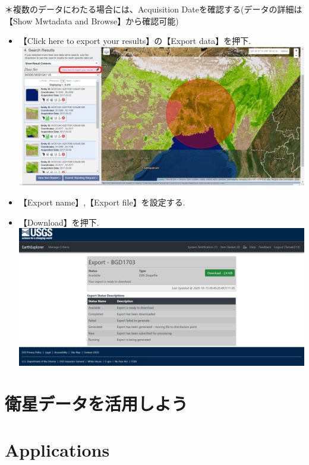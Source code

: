 \documentclass[
]{book}
\begin{document}
＊複数のデータにわたる場合には、Acquisition Dateを確認する(データの詳細は【Show Mwtadata and Browse】から確認可能)

\begin{itemize}
\item
  【Click here to export your results】の【Export data】を押下.\\
  \includegraphics{images/download.png}
\item
  【Export name】,【Export file】を設定する.
\item
  【Download】を押下.\\
  \includegraphics{images/last.png}
\end{itemize}

\hypertarget{ux885bux661fux30c7ux30fcux30bfux3092ux6d3bux7528ux3057ux3088ux3046}{%
\chapter{衛星データを活用しよう}\label{ux885bux661fux30c7ux30fcux30bfux3092ux6d3bux7528ux3057ux3088ux3046}}

\hypertarget{applications}{%
\chapter{Applications}\label{applications}}
\end{document}
